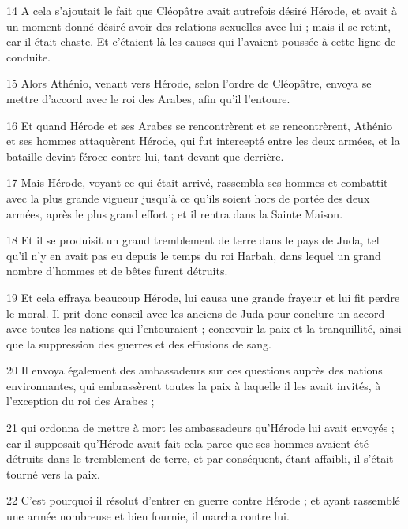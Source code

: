 \par 14 A cela s'ajoutait le fait que Cléopâtre avait autrefois désiré Hérode, et avait à un moment donné désiré avoir des relations sexuelles avec lui ; mais il se retint, car il était chaste. Et c'étaient là les causes qui l'avaient poussée à cette ligne de conduite.

\par 15 Alors Athénio, venant vers Hérode, selon l'ordre de Cléopâtre, envoya se mettre d'accord avec le roi des Arabes, afin qu'il l'entoure.

\par 16 Et quand Hérode et ses Arabes se rencontrèrent et se rencontrèrent, Athénio et ses hommes attaquèrent Hérode, qui fut intercepté entre les deux armées, et la bataille devint féroce contre lui, tant devant que derrière.

\par 17 Mais Hérode, voyant ce qui était arrivé, rassembla ses hommes et combattit avec la plus grande vigueur jusqu'à ce qu'ils soient hors de portée des deux armées, après le plus grand effort ; et il rentra dans la Sainte Maison.

\par 18 Et il se produisit un grand tremblement de terre dans le pays de Juda, tel qu'il n'y en avait pas eu depuis le temps du roi Harbah, dans lequel un grand nombre d'hommes et de bêtes furent détruits.

\par 19 Et cela effraya beaucoup Hérode, lui causa une grande frayeur et lui fit perdre le moral. Il prit donc conseil avec les anciens de Juda pour conclure un accord avec toutes les nations qui l'entouraient ; concevoir la paix et la tranquillité, ainsi que la suppression des guerres et des effusions de sang.

\par 20 Il envoya également des ambassadeurs sur ces questions auprès des nations environnantes, qui embrassèrent toutes la paix à laquelle il les avait invités, à l'exception du roi des Arabes ;

\par 21 qui ordonna de mettre à mort les ambassadeurs qu'Hérode lui avait envoyés ; car il supposait qu'Hérode avait fait cela parce que ses hommes avaient été détruits dans le tremblement de terre, et par conséquent, étant affaibli, il s'était tourné vers la paix.

\par 22 C'est pourquoi il résolut d'entrer en guerre contre Hérode ; et ayant rassemblé une armée nombreuse et bien fournie, il marcha contre lui.

